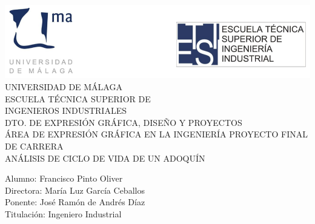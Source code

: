 \begin{titlepage}
\begin{center}
{\centering \includegraphics{portada.png}}
\vfill
{\LARGE UNIVERSIDAD DE MÁLAGA\\
ESCUELA TÉCNICA SUPERIOR DE\\[10pt]
INGENIEROS INDUSTRIALES}\\[25pt]
{\large DTO. DE EXPRESIÓN GRÁFICA, DISEÑO Y PROYECTOS\\
ÁREA DE EXPRESIÓN GRÁFICA EN LA INGENIERÍA}
\vfill
{\Large PROYECTO FINAL DE CARRERA\\[10pt]
ANÁLISIS DE CICLO DE VIDA DE UN ADOQUÍN}
\end{center}
\vfill
\begin{flushright}
Alumno: Francisco Pinto Oliver\\
Directora: María Luz García Ceballos\\
Ponente: José Ramón de Andrés Díaz\\
Titulación: Ingeniero Industrial
\end{flushright}
\end{titlepage}
